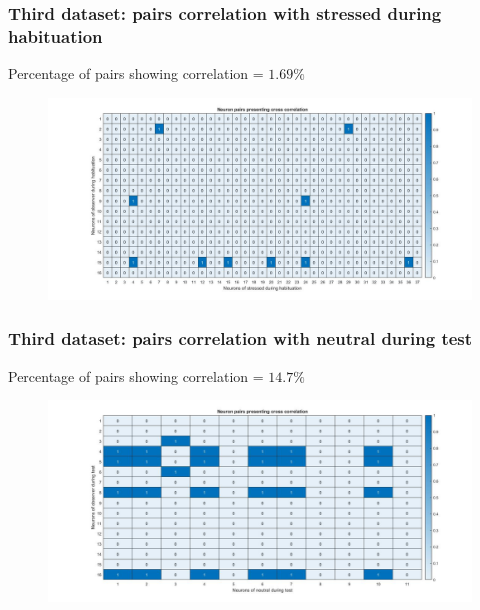 \documentclass{beamer}
\begin{document}
\begin{frame}
\frametitle{Third dataset: pairs correlation with stressed during habituation}

Percentage of pairs showing correlation = $ 1.69\%$

\begin{figure}[H]
	\begin{center}
		\hspace*{-1cm}
		\includegraphics[scale=.28]{neuron_corr_stress_hab3.jpg} 
	\end{center}  
	
	
\end{figure}

\end{frame}

\begin{frame}
\frametitle{Third dataset: pairs correlation with neutral during test}

Percentage of pairs showing correlation = $ 14.7\%$

\begin{figure}[H]
	\begin{center}
		\hspace*{-1cm}
		\includegraphics[scale=.28]{neuron_corr_neut_test3.jpg} 
	\end{center}  
	
	
\end{figure}

\end{frame}
\end{document}
